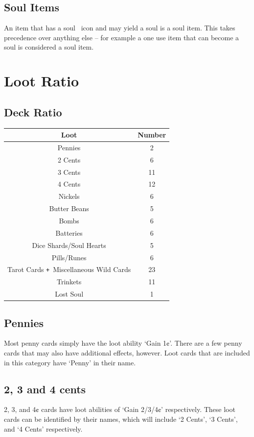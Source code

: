 \documentclass[
  fontsize=10pt,
  paper=a5,
  version=last,
  chapterprefix=true,
  bindingoffset=5mm,
  ]{scrbook}
\newcommand*{\inlineicon}[1]{%
    \raisebox{-.3\baselineskip}{%
        \smash{%
            \texttt{[image: \#1]}%
        }%
    }%
}
\newcommand{\soul}{\inlineicon{./assets/ms-soul.png}}
\def\plus{\texttt{+}}
\begin{document}
    \subsection*{Soul Items}
    An item that has a soul\soul\ icon and may yield a soul is a soul item. This takes precedence over anything else – for example a one use item that can become a soul is considered a soul item.

    \section{Loot Ratio}
    \subsection*{Deck Ratio}
    \begin{tabular}{ | c | c | }
        \hline
        \textbf{Loot} & \textbf{Number}\\
        \hline 
        Pennies & 2\\
        2 Cents & 6\\
        3 Cents & 11\\
        4 Cents & 12\\
        Nickels & 6\\
        Butter Beans & 5\\
        Bombs & 6\\
        Batteries & 6\\
        Dice Shards/Soul Hearts & 5\\
        Pills/Runes & 6\\
        Tarot Cards \plus\ Miscellaneous Wild Cards & 23\\
        Trinkets & 11\\
        Lost Soul & 1\\
        \hline
    \end{tabular}
    \subsection*{Pennies}
    Most penny cards simply have the loot ability ‘Gain 1¢’. There are a few penny cards that may also have additional effects, however. Loot cards that are included in this category have ‘Penny’ in their name.
    \subsection*{2, 3 and 4 cents}
    2, 3, and 4¢ cards have loot abilities of ‘Gain 2/3/4¢’ respectively. These loot cards can be identified by their names, which will include ‘2 Cents’, ‘3 Cents’, and ‘4 Cents’ respectively.
\end{document}
